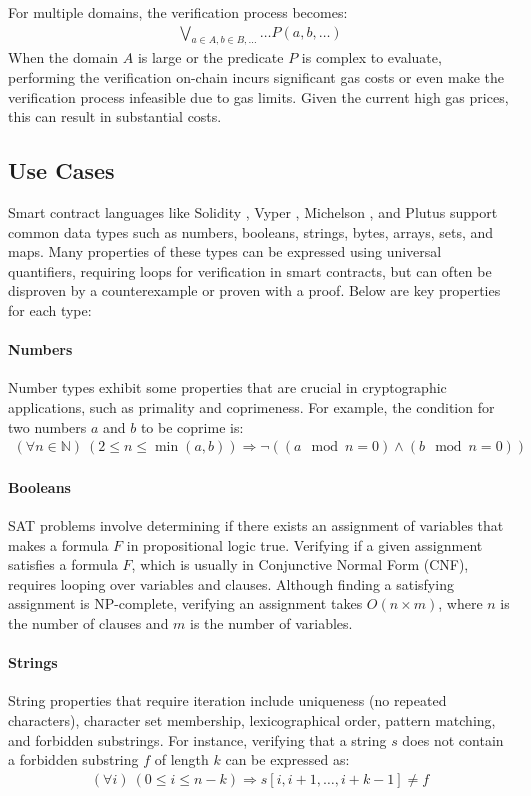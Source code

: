 \documentclass[runningheads]{llncs}
\begin{document}
For multiple domains, the verification process becomes:
\begin{gather}
  \label{eq:8}
  \bigvee_{a \in A, b \in B, \dots} \dots P(a, b, \dots)
\end{gather}
When the domain \(A\) is large or the predicate \(P\) is complex to evaluate, performing the verification on-chain incurs significant gas costs or even make the verification process infeasible due to gas limits. Given the current high gas prices, this can result in substantial costs.
\subsection{Use Cases}
Smart contract languages like Solidity \cite{solidity}, Vyper \cite{vyper}, Michelson \cite{michelson,michelson1}, and Plutus \cite{plutus} support common data types such as numbers, booleans, strings, bytes, arrays, sets, and maps. Many properties of these types can be expressed using universal quantifiers, requiring loops for verification in smart contracts, but can often be disproven by a counterexample or proven with a proof. Below are key properties for each type:
\paragraph{\textbf{Numbers}}
Number types exhibit some properties that are crucial in cryptographic applications, such as primality and coprimeness. For example, the condition for two numbers \(a\) and \(b\) to be coprime is:
\begin{gather*}
\label{}
(\forall n \in \mathbb{N}) \ (2 \leq n \leq \min(a, b)) \Rightarrow \neg((a \mod n = 0) \wedge (b \mod n = 0))
\end{gather*}
\paragraph{\textbf{Booleans}}
SAT problems involve determining if there exists an assignment of variables that makes a formula \( F \) in propositional logic true. Verifying if a given assignment satisfies a formula \( F \), which is usually in Conjunctive Normal Form (CNF), requires looping over variables and clauses. Although finding a satisfying assignment is NP-complete, verifying an assignment takes \( O(n \times m) \), where \( n \) is the number of clauses and \( m \) is the number of variables.
\paragraph{\textbf{Strings}}
String properties that require iteration include uniqueness (no repeated characters), character set membership, lexicographical order, pattern matching, and forbidden substrings. For instance, verifying that a string \(s\) does not contain a forbidden substring \(f\) of length \(k\) can be expressed as:
\begin{gather*}
(\forall i) \ (0 \leq i \leq n - k) \Rightarrow s[i, i+1, \dots, i+k-1] \neq f
\end{gather*}
\end{document}

